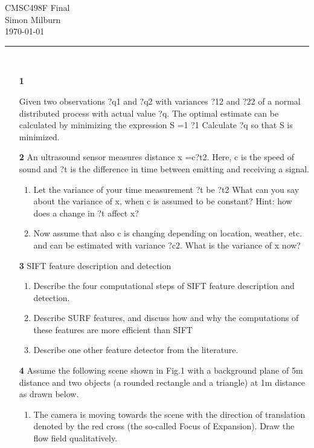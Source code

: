 \documentclass[11pt]{article}
\begin{document}
\begingroup  
  \centering
  \LARGE CMSC498F Final\\[.5em]
  \large Simon Milburn\\[.5em]
  \large \today\\[.5em]
  \noindent\rule[0.5ex]{\linewidth}{1pt}
   \large \\ [2em]
\endgroup

	\begin{enumerate}
	
	\item[\textbf{1}] 
		
		Given two observations ?q1 and ?q2 with variances ?12 and ?22 of a normal distributed process
		with actual value ?q. The optimal estimate can be calculated by minimizing the expression
		S =1 ?1
		Calculate ?q so that S is minimized.
		
	\item[\textbf{2}] 
		 An ultrasound sensor measures distance x =c?t2. Here, c is the speed of sound and ?t is the
		difference in time between emitting and receiving a signal.
		\begin{enumerate} 
			\item Let the variance of your time measurement ?t be ?t2 What can you say about the variance of
			x, when c is assumed to be constant? Hint: how does a change in ?t affect x?
			
			\item Now assume that also c is changing depending on location, weather, etc. and can be estimated
			with variance ?c2. What is the variance of x now?
		\end{enumerate}
		
	\item[\textbf{3}] 
		 SIFT feature description and detection
		\begin{enumerate} 
			\item Describe the four computational steps of SIFT feature description and detection.
			\item Describe SURF features, and discuss how and why the computations of these features are
			more efficient than SIFT
			\item Describe one other feature detector from the literature.
		\end{enumerate}
		
	\item[\textbf{4}] 
		Assume the following scene shown in Fig.1 with a background plane of 5m distance and two
		objects (a rounded rectangle and a triangle) at 1m distance as drawn below.
		\begin{enumerate} 
			\item The camera is moving towards the scene with the direction of translation denoted by the red
			cross (the so-called Focus of Expansion). Draw the flow field qualitatively.		
			

\end{enumerate}
\end{enumerate}
\end{document}
